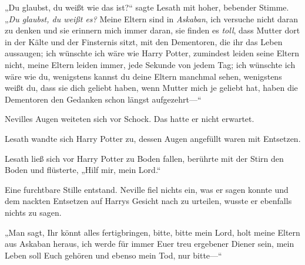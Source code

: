 „Du glaubst, du weißt wie das ist?“ sagte Lesath mit hoher, bebender Stimme. „\emph{Du glaubst, du weißt es?} Meine Eltern sind in \emph{Askaban}, ich versuche nicht daran zu denken und sie erinnern mich immer daran, sie finden es \emph{toll}, dass Mutter dort in der Kälte und der Finsternis sitzt, mit den Dementoren, die ihr das Leben aussaugen; ich wünschte ich wäre wie Harry Potter, zumindest leiden seine Eltern nicht, meine Eltern leiden immer, jede Sekunde von jedem Tag; ich wünschte ich wäre wie du, wenigstens kannst du deine Eltern manchmal sehen, wenigstens weißt du, dass sie dich geliebt haben, wenn Mutter mich je geliebt hat, haben die Dementoren den Gedanken schon längst aufgezehrt—“

Nevilles Augen weiteten sich vor Schock. Das hatte er nicht erwartet.

Lesath wandte sich Harry Potter zu, dessen Augen angefüllt waren mit Entsetzen.

Lesath ließ sich vor Harry Potter zu Boden fallen, berührte mit der Stirn den Boden und flüsterte, „Hilf mir, mein Lord.“

Eine furchtbare Stille entstand. Neville fiel nichts ein, was er sagen konnte und dem nackten Entsetzen auf Harrys Gesicht nach zu urteilen, wusste er ebenfalls nichts zu sagen.

„Man sagt, Ihr könnt alles fertigbringen, bitte, bitte mein Lord, holt meine Eltern aus Askaban heraus, ich werde für immer Euer treu ergebener Diener sein, mein Leben soll Euch gehören und ebenso mein Tod, nur bitte—“

